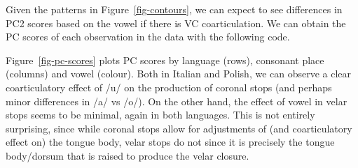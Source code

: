 \documentclass[
  man,
  longtable,
  nolmodern,
  notxfonts,
  notimes,
  colorlinks=true,linkcolor=blue,citecolor=blue,urlcolor=blue]{apa7}
\newenvironment{Shaded}{\begin{snugshade}}{\end{snugshade}}
\newcommand{\AttributeTok}[1]{\textcolor[rgb]{0.40,0.45,0.13}{#1}}
\newcommand{\DecValTok}[1]{\textcolor[rgb]{0.68,0.00,0.00}{#1}}
\newcommand{\FunctionTok}[1]{\textcolor[rgb]{0.28,0.35,0.67}{#1}}
\newcommand{\NormalTok}[1]{\textcolor[rgb]{0.00,0.23,0.31}{#1}}
\newcommand{\OtherTok}[1]{\textcolor[rgb]{0.00,0.23,0.31}{#1}}
\newcommand{\SpecialCharTok}[1]{\textcolor[rgb]{0.37,0.37,0.37}{#1}}
\newcommand{\StringTok}[1]{\textcolor[rgb]{0.13,0.47,0.30}{#1}}
\begin{document}
Given the patterns in Figure~\ref{fig-contours}, we can expect to see
differences in PC2 scores based on the vowel if there is VC
coarticulation. We can obtain the PC scores of each observation in the
data with the following code.

\begin{Shaded}
\end{Shaded}

Figure~\ref{fig-pc-scores} plots PC scores by language (rows), consonant
place (columns) and vowel (colour). Both in Italian and Polish, we can
observe a clear coarticulatory effect of /u/ on the production of
coronal stops (and perhaps minor differences in /a/ vs /o/). On the
other hand, the effect of vowel in velar stops seems to be minimal,
again in both languages. This is not entirely surprising, since while
coronal stops allow for adjustments of (and coarticulatory effect on)
the tongue body, velar stops do not since it is precisely the tongue
body/dorsum that is raised to produce the velar closure.
\end{document}
